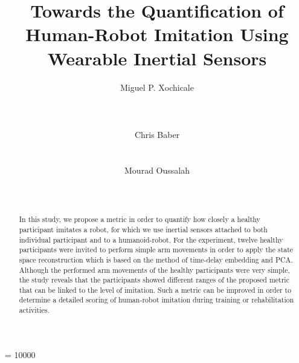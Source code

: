 \documentclass{sig-alternate-05-2015}
\begin{document}




\widowpenalty = 10000



\title{Towards the Quantification of Human-Robot Imitation Using Wearable Inertial Sensors}


\author{
\alignauthor Miguel P. Xochicale\\
      \\
        \\
         \\
\alignauthor Chris Baber\\
        \\
         \\
\alignauthor Mourad Oussalah\\
        \\
         \\
}




\maketitle
\begin{abstract}
In this study, we propose a metric in order to quantify how closely a healthy participant imitates a robot,
for which we use inertial sensors attached to both individual participant and to a humanoid-robot.
For the experiment, twelve healthy participants were invited to perform
simple arm movements in order to apply
the state space reconstruction which
is based on the method of time-delay embedding and PCA.
Although the performed arm movements of the healthy participants were very simple,
the study reveals that the participants showed different ranges of the proposed metric
that can be linked to the level of imitation.
Such a metric can be improved in order to determine
a detailed scoring of human-robot imitation
during training or rehabilitation activities.
\end{abstract}
\end{document}
